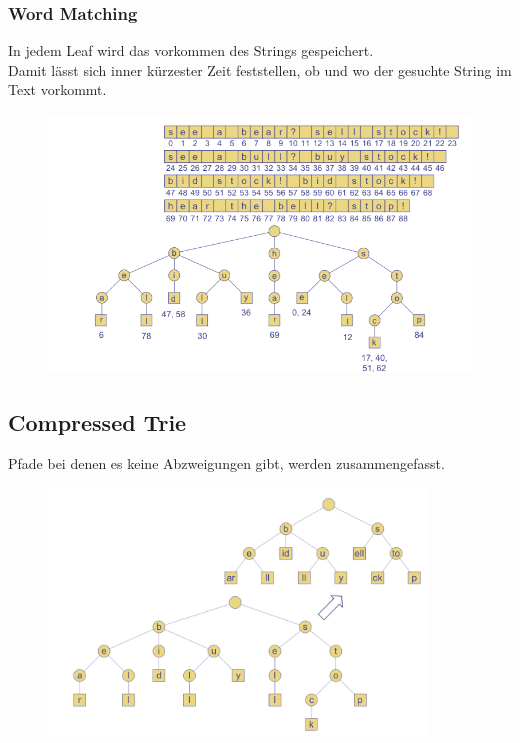 \documentclass[a4paper,10pt]{report}
\begin{document}
\subsubsection{Word Matching}
In jedem Leaf wird das vorkommen des Strings gespeichert.\\
Damit lässt sich inner kürzester Zeit feststellen, ob und wo der gesuchte String im Text vorkommt.
\begin{figure}[H]
	\begin{center}
  		\includegraphics[width=\textwidth]{img/standardtriewordmatching.png}
	\end{center}
\end{figure}
\newpage
\subsection{Compressed Trie}
Pfade bei denen es keine Abzweigungen gibt, werden zusammengefasst.
\begin{figure}[H]
	\begin{center}
  		\includegraphics[width=0.9\textwidth]{img/compressedtrie.png}
	\end{center}
\end{figure}
\end{document}
